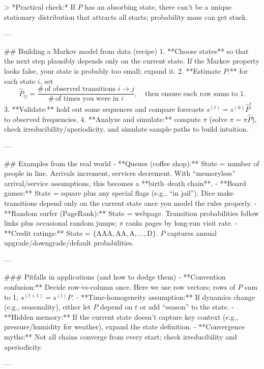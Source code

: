 > *Practical check:* If $P$ has an absorbing state, there can’t be a unique stationary distribution that attracts all starts; probability mass can get stuck.

---

## Building a Markov model from data (recipe)
1. **Choose states** so that the next step plausibly depends only on the current state. If the Markov property looks false, your state is probably too small; expand it.
2. **Estimate $P$:** for each state $i$, set
   $$
   \widehat{P}_{ij}=\frac{\#\,\text{of observed transitions }i\to j}{\#\,\text{of times you were in }i},\quad \text{then ensure each row sums to 1.}
   $$
3. **Validate:** hold out some sequences and compare forecasts $s^{(t)}=s^{(0)}\widehat{P}^t$ to observed frequencies.
4. **Analyze and simulate:** compute $\pi$ (solve $\pi=\pi\widehat{P}$), check irreducibility/aperiodicity, and simulate sample paths to build intuition.

---

## Examples from the real world
- **Queues (coffee shop):** State = number of people in line. Arrivals increment, services decrement. With “memoryless” arrival/service assumptions, this becomes a **birth–death chain**.
- **Board games:** State = square plus any special flags (e.g., “in jail”). Dice make transitions depend only on the current state once you model the rules properly.
- **Random surfer (PageRank):** State = webpage. Transition probabilities follow links plus occasional random jumps; $\pi$ ranks pages by long-run visit rate.
- **Credit ratings:** State = $\{\mathrm{AAA},\mathrm{AA},\mathrm{A},\dots,\mathrm{D}\}$. $P$ captures annual upgrade/downgrade/default probabilities.

---

### Pitfalls in applications (and how to dodge them)
- **Convention confusion:** Decide row-vs-column once. Here we use row vectors; rows of $P$ sum to 1; $s^{(t+1)}=s^{(t)}P$.
- **Time-homogeneity assumption:** If dynamics change (e.g., seasonality), either let $P$ depend on $t$ or add “season” to the state.
- **Hidden memory:** If the current state doesn’t capture key context (e.g., pressure/humidity for weather), expand the state definition.
- **Convergence myths:** Not all chains converge from every start; check irreducibility and aperiodicity.

---